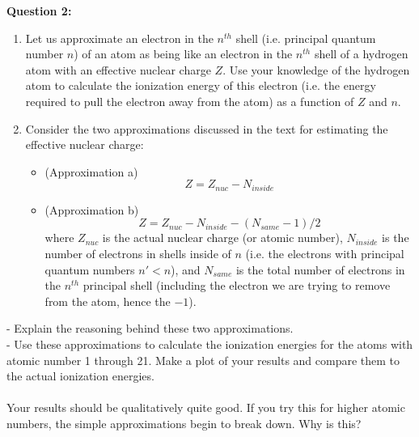 \documentclass[11pt]{article}
\begin{document}
\begin{bluebox}
  \textbf{Question 2:}
  \begin{enumerate}[label=(\alph*)]
    \item Let us approximate an electron in the $n^{th}$ shell (i.e. principal quantum number $n$) of an atom as being like an electron in the $n^{th}$ shell of a hydrogen atom with an effective nuclear charge $Z$. Use your knowledge of the hydrogen atom to calculate the ionization energy of this electron (i.e. the energy required to pull the electron away from the atom) as a function of $Z$ and $n$.
    
    \item Consider the two approximations discussed in the text for estimating the effective nuclear charge: 
    \begin{itemize}
      \item (Approximation a) $$ Z = Z_{nuc} - N_{inside} $$
      \item (Approximation b) $$ Z = Z_{nuc} - N_{inside} - \left(N_{same} - 1\right)/2 $$ where $Z_{nuc}$ is the actual nuclear charge (or atomic number), $N_{inside}$ is the number of electrons in shells inside of $n$ (i.e. the electrons with principal quantum numbers $n' < n$), and $N_{same}$ is the total number of electrons in the $n^{th}$ principal shell (including the electron we are trying to remove from the atom, hence the $-1$).
    \end{itemize}
  \end{enumerate} - Explain the reasoning behind these two approximations. \\
  - Use these approximations to calculate the ionization energies for the atoms with atomic number 1 through 21. Make a plot of your results and compare them to the actual ionization energies.
  \\
  \\
  Your results should be qualitatively quite good. If you try this for higher atomic numbers, the simple approximations begin to break down. Why is this? 
\end{bluebox}
\end{document}
